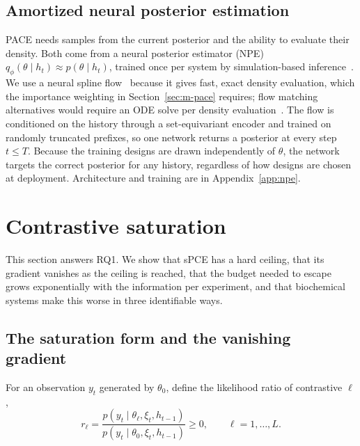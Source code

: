 \subsection{Amortized neural posterior estimation}
\label{sec:m-npe}

PACE needs samples from the current posterior and the ability to evaluate their
density. Both come from a neural posterior estimator (NPE)
$q_\phi(\theta\mid h_t)\approx p(\theta\mid h_t)$, trained once per system by
simulation-based inference~\citep{cranmer2020frontier,greenberg2019automatic}. We use
a neural spline flow~\citep{durkan2019neural} because it gives fast, exact density
evaluation, which the importance weighting in Section~\ref{sec:m-pace} requires; flow
matching alternatives would require an ODE solve per density
evaluation~\citep{wildberger2024flow}. The flow is conditioned on the history through
a set-equivariant encoder and trained on randomly truncated prefixes, so one network
returns a posterior at every step $t\le T$. Because the training designs are drawn
independently of $\theta$, the network targets the correct posterior for any history,
regardless of how designs are chosen at deployment. Architecture and training are in
Appendix~\ref{app:npe}.

\section{Contrastive saturation}
\label{sec:m-saturation}

This section answers RQ1. We show that sPCE has a hard ceiling, that its gradient
vanishes as the ceiling is reached, that the budget needed to escape grows
exponentially with the information per experiment, and that biochemical systems make
this worse in three identifiable ways.

\subsection{The saturation form and the vanishing gradient}
\label{sec:m-satform}

For an observation $y_t$ generated by $\theta_0$, define the likelihood ratio of
contrastive $\ell$,
\begin{equation}
\label{eq:rratio}
r_\ell = \frac{p(y_t\mid\theta_\ell,\xi_t,h_{t-1})}{p(y_t\mid\theta_0,\xi_t,h_{t-1})}\ge 0,
\qquad \ell=1,\dots,L.
\end{equation}

